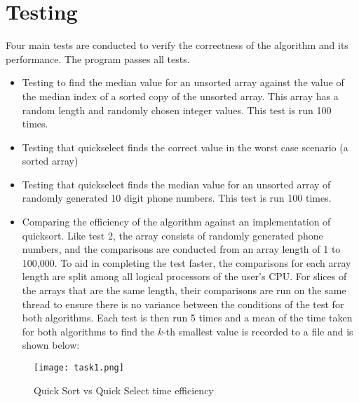 \documentclass{report}
\begin{document}
\section{Testing}
Four main tests are conducted to verify the correctness of the algorithm and its performance. The program passes all tests.
\begin{itemize}
	\item Testing to find the median value for an unsorted array against the value of the median index of a sorted copy of the unsorted array. This array has a random length and randomly chosen integer values. This test is run 100 times.
	\item Testing that quickselect finds the correct value in the worst case scenario (a sorted array)
	\item Testing that quickselect finds the median value for an unsorted array of randomly generated 10 digit phone numbers. This test is run 100 times.
	\item Comparing the efficiency of the algorithm against an implementation of quicksort. Like test 2, the array consists of randomly generated phone numbers, and the comparisons are conducted from an array length of 1 to 100,000. To aid in completing the test faster, the comparisons for each array length are split among all logical processors of the user's CPU\@. For slices of the arrays that are the same length, their comparisons are run on the same thread to ensure there is no variance between the conditions of the test for both algorithms. Each test is then run 5 times and a mean of the time taken for both algorithms to find the \(k\)-th smallest value is recorded to a file and is shown below:
\end{itemize}

\begin{figure}[H]
	\centering
	\texttt{[image: task1.png]}
	\caption{Quick Sort vs Quick Select time efficiency}
	\label{fig:task1_time_eff}
\end{figure}
\end{document}
